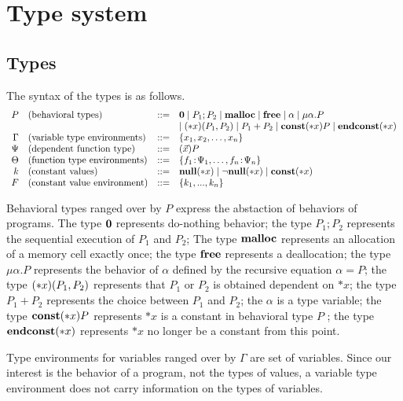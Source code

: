 \section{Type system}
\label{sec:typesystem}

\subsection{Types}
The syntax of the types is as follows.
\[
\begin{array}{rlcl}
  P & (\mbox{behavioral types})&::=& {\bf 0} \mid P_{1};P_{2}  \mid \mathbf{malloc} \mid \mathbf{free} \mid \alpha \mid \mu\alpha.P \\
  &  &  & \mid (*x)(P_1,P_2) \mid P_1 + P_2 \mid \mathbf{const}(*x) P  \mid \mathbf{endconst}(*x)\\
  \Gamma & (\mbox{variable type environments}) &::=& \{x_1, x_2, \dots, x_n\}\\
  \Psi & (\mbox{dependent function type}) &::=& (\vec{x})P\\
  \Theta & (\mbox{function type environments}) &::=& \{f_1\!:\! \Psi_1,\dots,f_n\!:\! \Psi_n\}\\
  k & (\mbox{constant values}) &::=& {\bf null}(*x) \mid \neg{\bf null}(*x) \mid \mathbf{const}(*x)   \\
  F & (\mbox{constant value environment}) &::=& \{k_1,...,k_n\} \\
\end{array}
\]

Behavioral types ranged over by \(P\) express the abstaction of
behaviors of programs. The type \({\bf 0}\) represents do-nothing
behavior; the type \(P_1;P_2\) represents the sequential execution of
\(P_1\) and \(P_2\); The type \(\mathbf{malloc}\) represents an allocation of
a memory cell exactly once; the type \(\mathbf{free}\) represents a
deallocation; the type \(\mu \alpha.P\) represents the behavior of
\(\alpha\) defined by the recursive equation \(\alpha = P\); the type
\((*x)(P_1,P_2)\) represents that \(P_1\) or \(P_2\) is obtained
dependent on \(*x\); the type \(P_1 + P_2\) represents the choice
between \(P_1\) and \(P_2\); the \(\alpha\) is a type variable; the
type \(\mathbf{const}(*x) P\) represents \(*x\) is a constant in behavioral
type \(P\) ; the type \(\mathbf{endconst}(*x)\) represents \(*x\) no longer be a
constant from this point.

Type environments for variables ranged over by \(\Gamma\) are set of
variables.  Since our interest is the behavior of a program, not the
types of values, a variable type environment does not carry
information on the types of variables.

